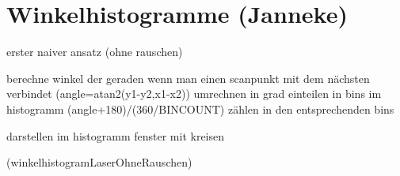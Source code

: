 \section{Winkelhistogramme (Janneke)}

erster naiver ansatz (ohne rauschen)

berechne winkel der geraden wenn man einen scanpunkt mit dem nächsten verbindet (angle=atan2(y1-y2,x1-x2))
umrechnen in grad
einteilen in bins im histogramm (angle+180)/(360/BINCOUNT)
zählen in den entsprechenden bins

darstellen im histogramm fenster mit kreisen

(winkelhistogramLaserOhneRauschen)